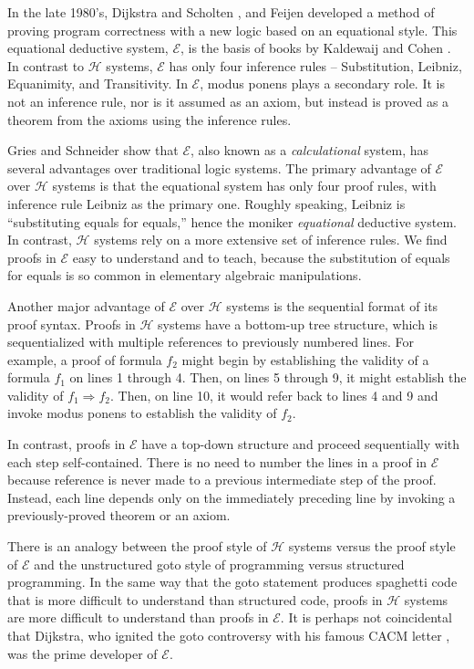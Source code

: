 \documentclass[12pt, fleqn, leqno]{article}
\newcommand{\impl}{\ensuremath{\Rightarrow}}        %
\begin{document}
In the late 1980's, Dijkstra and Scholten \cite{DandS}, and Feijen \cite{Feij} developed a method of proving program correctness with a new logic based on an equational style.
This equational deductive system, $\mathcal{E}$, is the basis of books by Kaldewaij \cite{Kald} and Cohen \cite{Cohen}.
In contrast to $\mathcal{H}$ systems, $\mathcal{E}$ has only four inference rules -- Substitution, Leibniz, Equanimity, and Transitivity.
In $\mathcal{E}$, modus ponens plays a secondary role.
It is not an inference rule, nor is it assumed as an axiom, but instead is proved as a theorem from the axioms using the inference rules.

Gries and Schneider \cite{Gries1995, Gries1995145} show that $\mathcal{E}$, also known as a \textit{calculational} system, has several advantages over traditional logic systems.
The primary advantage of $\mathcal{E}$ over $\mathcal{H}$ systems is that the equational system has only four proof rules, with inference rule Leibniz as the primary one.
Roughly speaking, Leibniz is ``substituting equals for equals,'' hence the moniker \textit{equational} deductive system.
In contrast, $\mathcal{H}$ systems rely on a more extensive set of inference rules.
We find proofs in $\mathcal{E}$ easy to understand and to teach, because the substitution of equals for equals is so common in elementary algebraic manipulations.

Another major advantage of $\mathcal{E}$ over $\mathcal{H}$ systems is the sequential format of its proof syntax.
Proofs in $\mathcal{H}$ systems have a bottom-up tree structure, which is sequentialized with multiple references to previously numbered lines.
For example, a proof of formula $f_2$ might begin by establishing the validity  of a formula $f_1$ on lines 1 through 4.
Then, on lines 5 through 9, it might establish the validity of $f_1\impl f_2$.
Then, on line 10, it would refer back to lines 4 and 9 and invoke modus ponens to establish the validity of $f_2$.

In contrast, proofs in $\mathcal{E}$ have a top-down structure and proceed sequentially with each step self-contained.
There is no need to number the lines in a proof in $\mathcal{E}$ because reference is never made to a previous intermediate step of the proof.
Instead, each line depends only on the immediately preceding line by invoking a previously-proved theorem or an axiom.

There is an analogy between the proof style of $\mathcal{H}$ systems versus the proof style of $\mathcal{E}$ and the unstructured goto style of programming versus structured programming.
In the same way that the goto statement produces spaghetti code that is more difficult to understand than structured code, proofs in $\mathcal{H}$ systems are more difficult to understand than proofs in $\mathcal{E}$.
It is perhaps not coincidental that Dijkstra, who ignited the goto controversy with his famous CACM letter \cite{Dijkstra:1968:LEG:362929.362947}, was the prime developer of $\mathcal{E}$.
\end{document}
